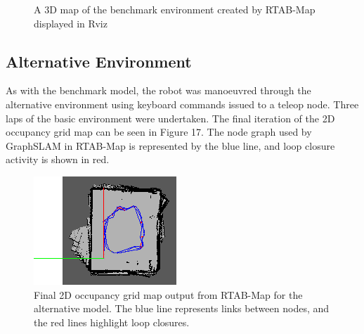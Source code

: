 \documentclass[a4paper]{article}
\begin{document}
\vspace{0.2cm}

\begin{figure}[h]
\centering
{}
\caption{A 3D map of the benchmark environment created by RTAB-Map displayed in Rviz}
\end{figure}

\newpage

\subsection{Alternative Environment}
As with the benchmark model, the robot was manoeuvred through the alternative environment using keyboard commands issued to a teleop node. Three laps of the basic environment were undertaken. The final iteration of the 2D occupancy grid map can be seen in Figure 17. The node graph used by GraphSLAM in RTAB-Map is represented by the blue line, and loop closure activity is shown in red.
\begin{figure}[h]
\centering
\includegraphics[scale=1.2]{slam_house_2_graph_view}
\caption{Final 2D occupancy grid map output from RTAB-Map for the alternative model. The blue line represents links between nodes, and the red lines highlight loop closures.}
\end{figure}
\end{document}
